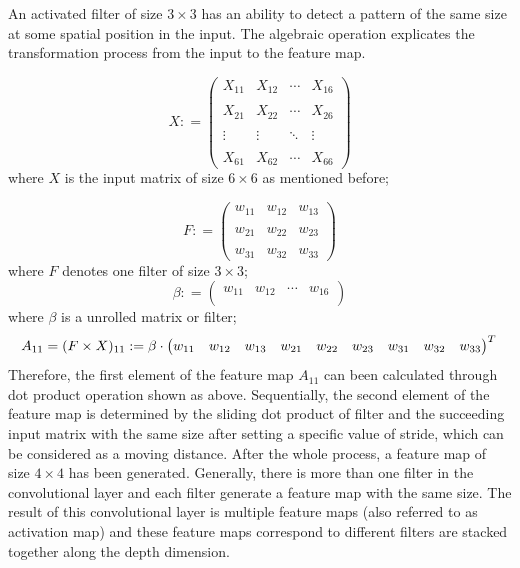 \documentclass[]{krantz}
\begin{document}
An activated filter of size \(3 \times 3\) has an ability to detect a pattern of the same size at some spatial position in the input. The algebraic operation explicates the transformation process from the input to the feature map.

\[ X  : = \begin{pmatrix}
X_{11} & X_{12} & \cdots & X_{16}\\ \\
X_{21} & X_{22} & \cdots &X_{26} \\ \\
\vdots & \vdots & \ddots & \vdots \\ \\
X_{61} & X_{62} & \cdots & X_{66}
\end{pmatrix}\]
where \(X\) is the input matrix of size \(6 \times 6\) as mentioned before;

\[ F  : = \begin{pmatrix}
w_{11} & w_{12}  & w_{13}\\ \\
w_{21} & w_{22}  & w_{23} \\ \\
w_{31} & w_{32}  & w_{33}
\end{pmatrix}\]
where \(F\) denotes one filter of size \(3 \times 3\);
\[ \beta  : = \begin{pmatrix}
w_{11} & w_{12} & \cdots & w_{16}\\
\end{pmatrix}\]
where \(\beta\) is a unrolled matrix or filter;
\[ A_{11} = (F \times X)_{11}  : =
\beta \cdot \begin{pmatrix}
w_{11} & w_{12} & w_{13} & w_{21} & w_{22} & w_{23} & w_{31} & w_{32} & w_{33}\\
\end{pmatrix}^{T}\\\]
Therefore, the first element of the feature map \(A_{11}\) can been calculated through dot product operation shown as above. Sequentially, the second element of the feature map is determined by the sliding dot product of filter and the succeeding input matrix with the same size after setting a specific value of stride, which can be considered as a moving distance. After the whole process, a feature map of size \(4 \times 4\) has been generated. Generally, there is more than one filter in the convolutional layer and each filter generate a feature map with the same size. The result of this convolutional layer is multiple feature maps (also referred to as activation map) and these feature maps correspond to different filters are stacked together along the depth dimension.
\end{document}
